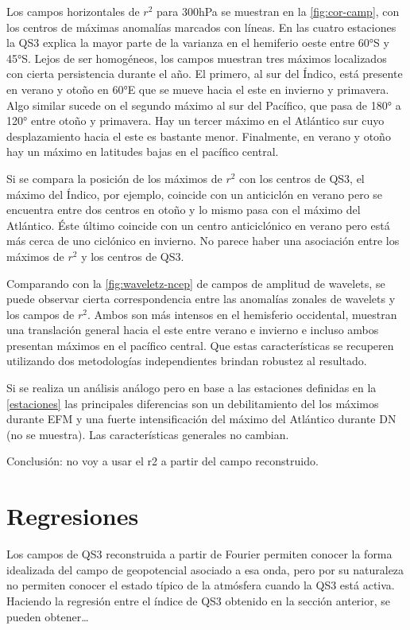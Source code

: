\documentclass[spanish,a4paper,12p]{book}
\begin{document}
Los campos horizontales de \(r^2\) para 300hPa se muestran en la
\autoref{fig:cor-camp}, con los centros de máximas anomalías marcados
con líneas. En las cuatro estaciones la QS3 explica la mayor parte de la
varianza en el hemiferio oeste entre 60°S y 45°S. Lejos de ser
homogéneos, los campos muestran tres máximos localizados con cierta
persistencia durante el año. El primero, al sur del Índico, está
presente en verano y otoño en 60°E que se mueve hacia el este en
invierno y primavera. Algo similar sucede on el segundo máximo al sur
del Pacífico, que pasa de 180° a 120° entre otoño y primavera. Hay un
tercer máximo en el Atlántico sur cuyo desplazamiento hacia el este es
bastante menor. Finalmente, en verano y otoño hay un máximo en latitudes
bajas en el pacífico central.

Si se compara la posición de los máximos de \(r^2\) con los centros de
QS3, el máximo del Índico, por ejemplo, coincide con un anticiclón en
verano pero se encuentra entre dos centros en otoño y lo mismo pasa con
el máximo del Atlántico. Éste último coincide con un centro
anticiclónico en verano pero está más cerca de uno ciclónico en
invierno. No parece haber una asociación entre los máximos de \(r^2\) y
los centros de QS3.

Comparando con la \autoref{fig:waveletz-ncep} de campos de amplitud de
wavelets, se puede observar cierta correspondencia entre las anomalías
zonales de wavelets y los campos de \(r^2\). Ambos son más intensos en
el hemisferio occidental, muestran una translación general hacia el este
entre verano e invierno e incluso ambos presentan máximos en el pacífico
central. Que estas características se recuperen utilizando dos
metodologías independientes brindan robustez al resultado.

Si se realiza un análisis análogo pero en base a las estaciones
definidas en la \autoref{estaciones} las principales diferencias son un
debilitamiento del los máximos durante EFM y una fuerte intensificación
del máximo del Atlántico durante DN (no se muestra). Las características
generales no cambian.

Conclusión: no voy a usar el r2 a partir del campo reconstruido.

\section{Regresiones}\label{regresiones}

Los campos de QS3 reconstruida a partir de Fourier permiten conocer la
forma idealizada del campo de geopotencial asociado a esa onda, pero por
su naturaleza no permiten conocer el estado típico de la atmósfera
cuando la QS3 está activa. Haciendo la regresión entre el índice de QS3
obtenido en la sección anterior, se pueden
obtener\ldots{}
\end{document}
